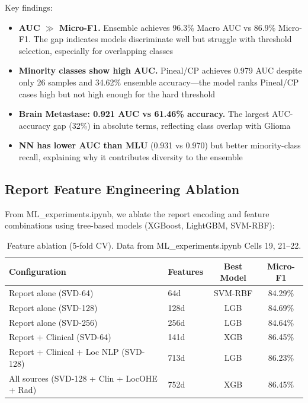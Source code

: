 Key findings:
\begin{itemize}
  \item \textbf{AUC $\gg$ Micro-F1.} Ensemble achieves 96.3\% Macro AUC vs 86.9\% Micro-F1. The gap indicates models discriminate well but struggle with threshold selection, especially for overlapping classes
  \item \textbf{Minority classes show high AUC.} Pineal/CP achieves 0.979 AUC despite only 26 samples and 34.62\% ensemble accuracy---the model ranks Pineal/CP cases high but not high enough for the hard threshold
  \item \textbf{Brain Metastase: 0.921 AUC vs 61.46\% accuracy.} The largest AUC-accuracy gap (32\%) in absolute terms, reflecting class overlap with Glioma
  \item \textbf{NN has lower AUC than MLU} (0.931 vs 0.970) but better minority-class recall, explaining why it contributes diversity to the ensemble
\end{itemize}

\subsection{Report Feature Engineering Ablation}

From ML\_experiments.ipynb, we ablate the report encoding and feature combinations using tree-based models (XGBoost, LightGBM, SVM-RBF):

\begin{table}[H]
\centering
\caption{Feature ablation (5-fold CV). Data from ML\_experiments.ipynb Cells 19, 21--22.}
\label{tab:feature_ablation}
\begin{tabular}{llcc}
\toprule
\textbf{Configuration} & \textbf{Features} & \textbf{Best Model} & \textbf{Micro-F1} \\
\midrule
Report alone (SVD-64) & 64d & SVM-RBF & 84.29\% \\
Report alone (SVD-128) & 128d & LGB & 84.69\% \\
Report alone (SVD-256) & 256d & LGB & 84.64\% \\
Report + Clinical (SVD-64) & 141d & XGB & 86.45\% \\
Report + Clinical + Loc NLP (SVD-128) & 713d & LGB & 86.23\% \\
All sources (SVD-128 + Clin + LocOHE + Rad) & 752d & XGB & 86.45\% \\
\bottomrule
\end{tabular}
\end{table}

